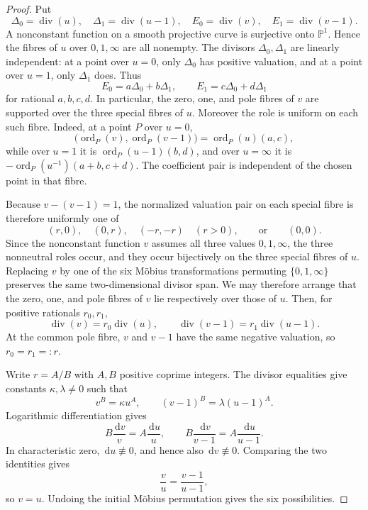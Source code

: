 \documentclass[11pt]{article}
\theoremstyle{definition}
\newcommand{\ord}{\operatorname{ord}}
\newcommand{\dd}{\,\mathrm d}
\begin{document}
\begin{proof}
Put
\[
 \Delta_0=\operatorname{div}(u),\quad
 \Delta_1=\operatorname{div}(u-1),\quad
 E_0=\operatorname{div}(v),\quad
 E_1=\operatorname{div}(v-1).
\]
A nonconstant function on a smooth projective curve is surjective onto
\(\mathbb P^1\).  Hence the fibres of \(u\) over \(0,1,\infty\) are all
nonempty.  The divisors \(\Delta_0,\Delta_1\) are linearly independent:
at a point over \(u=0\), only \(\Delta_0\) has positive valuation, and at
a point over \(u=1\), only \(\Delta_1\) does.  Thus
\[
 E_0=a\Delta_0+b\Delta_1,
 \qquad
 E_1=c\Delta_0+d\Delta_1
\]
for rational \(a,b,c,d\).  In particular, the zero, one, and pole fibres of
\(v\) are supported over the three special fibres of \(u\).  Moreover the
role is uniform on each such fibre.  Indeed, at a point \(P\) over \(u=0\),
\[
 \bigl(\ord_P(v),\ord_P(v-1)\bigr)
 =\ord_P(u)(a,c),
\]
while over \(u=1\) it is \(\ord_P(u-1)(b,d)\), and over \(u=\infty\) it is
\(-\ord_P(u^{-1})(a+b,c+d)\).  The coefficient pair is independent of the
chosen point in that fibre.

Because \(v-(v-1)=1\), the normalized valuation pair on each special fibre
is therefore uniformly one of
\[
 (r,0),\quad(0,r),\quad(-r,-r)\quad(r>0),
 \qquad\text{or}\qquad(0,0).
\]
Since the nonconstant function \(v\) assumes all three values
\(0,1,\infty\), the three nonneutral roles occur, and they occur
bijectively on the three special fibres of \(u\).  Replacing \(v\) by one
of the six Möbius transformations permuting \(\{0,1,\infty\}\) preserves
the same two-dimensional divisor span.  We may therefore arrange that the
zero, one, and pole fibres of \(v\) lie respectively over those of \(u\).
Then, for positive rationals \(r_0,r_1\),
\[
 \operatorname{div}(v)=r_0\operatorname{div}(u),
 \qquad
 \operatorname{div}(v-1)=r_1\operatorname{div}(u-1).
\]
At the common pole fibre, \(v\) and \(v-1\) have the same negative
valuation, so \(r_0=r_1=:r\).

Write \(r=A/B\) with \(A,B\) positive coprime integers.  The divisor
equalities give constants \(\kappa,\lambda\neq0\) such that
\[
 v^B=\kappa u^A,
 \qquad
 (v-1)^B=\lambda(u-1)^A.
\]
Logarithmic differentiation gives
\[
 B\frac{\dd v}{v}=A\frac{\dd u}{u},
 \qquad
 B\frac{\dd v}{v-1}=A\frac{\dd u}{u-1}.
\]
In characteristic zero, \(\dd u\not\equiv0\), and hence also
\(\dd v\not\equiv0\).  Comparing the two identities gives
\[
 \frac vu=\frac{v-1}{u-1},
\]
so \(v=u\).  Undoing the initial Möbius permutation gives the six
possibilities.
\end{proof}
\end{document}
